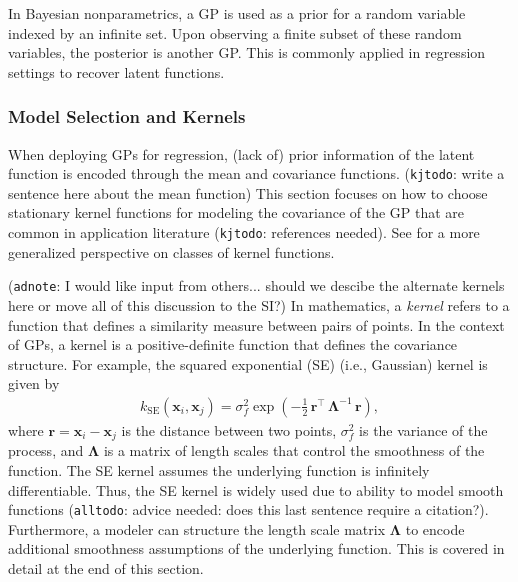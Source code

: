 \documentclass[journal=jacsat,manuscript=article, ]{achemso}
\newcommand{\kjnote}[1]{{\color{Blue} (\texttt{kjnote}: #1)}}
\newcommand{\kjtodo}[1]{{\color{Red} (\texttt{kjtodo}: #1)}}
\newcommand{\alltodo}[1]{{\color{Cyan} (\texttt{alltodo}: #1)}}
\newcommand{\xvec}{\ensuremath{\mathbf{x}}}
\newcommand{\adnote}[1]{{\color{OliveGreen} (\texttt{adnote}: #1)}}
\begin{document}
In Bayesian nonparametrics, a GP is used as a prior for a random variable indexed by an infinite set. Upon observing a finite subset of these random variables, the posterior is another GP. This is commonly applied in regression settings to recover latent functions.

\subsubsection{Model Selection and Kernels}

When deploying GPs for regression, (lack of) prior information of the latent function is encoded through the mean and covariance functions. \kjtodo{write a sentence here about the mean function} This section focuses on how to choose stationary kernel functions for modeling the covariance of the GP that are common in application literature \kjtodo{references needed}. See \citeauthor{Genton} \cite{Genton} for a more generalized perspective on classes of kernel functions.



\adnote{I would like input from others... should we descibe the alternate kernels here or move all of this discussion to the SI?} In mathematics, a \textit{kernel} refers to a function that defines a similarity measure between pairs of points. In the context of GPs, a kernel is a positive-definite function that defines the covariance structure. For example, the squared exponential (SE) (i.e., Gaussian) kernel is given by
\begin{gather}
     k_{\text{SE}}(\xvec_i,\xvec_j) = \sigma_f^2 \exp \left(-\frac{1}{2}\, \mathbf{r}^\intercal \,\boldsymbol{\Lambda}^{-1} \,\mathbf{r} \right), \label{eq: sekernel}
 \end{gather}
 where $\mathbf{r} = \xvec_i - \xvec_j$ is the distance between two points, $\sigma_f^2$ is the variance of the process, and $\boldsymbol{\Lambda}$ is a matrix of length scales that control the smoothness of the function. The SE kernel assumes the underlying function is infinitely differentiable. Thus, the SE kernel is widely used due to ability to model smooth functions \alltodo{advice needed: does this last sentence require a citation?}. Furthermore, a modeler can structure the length scale matrix $\boldsymbol{\Lambda}$ to encode additional smoothness assumptions of the underlying function. This is covered in detail at the end of this section. 
\end{document}

